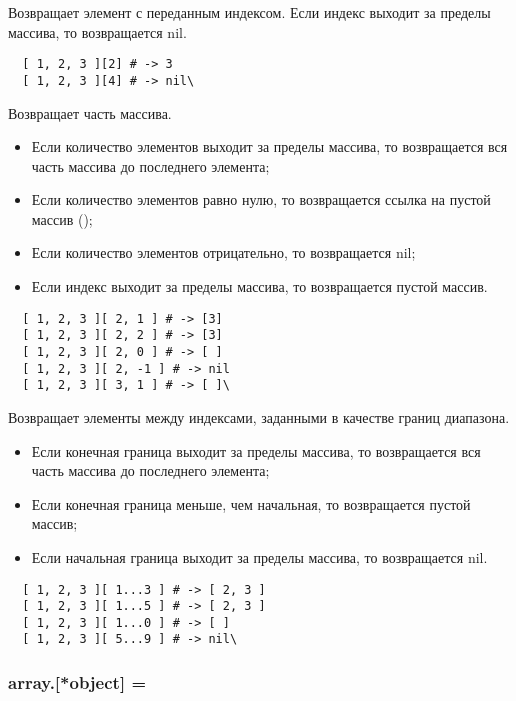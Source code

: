 \begin{methodlist}
  Возвращает элемент с переданным индексом. Если индекс выходит за пределы массива, то возвращается nil.
  \begin{verbatim}
  [ 1, 2, 3 ][2] # -> 3 
  [ 1, 2, 3 ][4] # -> nil\
  \end{verbatim}

  Возвращает часть массива.
  \begin{itemize}
    \item Если количество элементов выходит за пределы массива, то возвращается вся часть массива до последнего элемента;
    \item Если количество элементов равно нулю, то возвращается ссылка на пустой массив (\mono{[]});
    \item Если количество элементов отрицательно, то возвращается nil; 
    \item Если индекс выходит за пределы массива, то возвращается пустой массив.
  \end{itemize}
  \begin{verbatim}
  [ 1, 2, 3 ][ 2, 1 ] # -> [3] 
  [ 1, 2, 3 ][ 2, 2 ] # -> [3] 
  [ 1, 2, 3 ][ 2, 0 ] # -> [ ] 
  [ 1, 2, 3 ][ 2, -1 ] # -> nil 
  [ 1, 2, 3 ][ 3, 1 ] # -> [ ]\
  \end{verbatim}  

  Возвращает элементы между индексами, заданными в качестве границ диапазона.
  \begin{itemize}
    \item Если конечная граница выходит за пределы массива, то возвращается вся часть массива до последнего элемента;
    \item Если конечная граница меньше, чем начальная, то возвращается пустой массив;
    \item Если начальная граница выходит за пределы массива, то возвращается nil. 
   \end{itemize} 
  \begin{verbatim}
  [ 1, 2, 3 ][ 1...3 ] # -> [ 2, 3 ] 
  [ 1, 2, 3 ][ 1...5 ] # -> [ 2, 3 ] 
  [ 1, 2, 3 ][ 1...0 ] # -> [ ] 
  [ 1, 2, 3 ][ 5...9 ] # -> nil\
  \end{verbatim}
\end{methodlist}

\subsubsection*{array.[*object] =}

